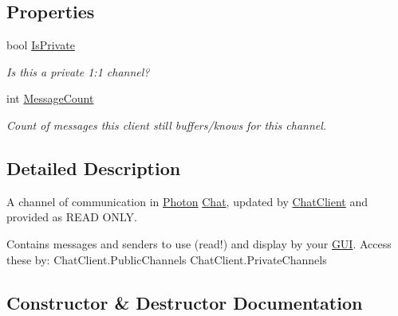 \subsection*{Properties}
\begin{DoxyCompactItemize}
\item 
bool \hyperlink{class_exit_games_1_1_client_1_1_photon_1_1_chat_1_1_chat_channel_a3486dbba0f3a83529fe4f327375548cb}{Is\+Private}
\begin{DoxyCompactList}\small\item\em Is this a private 1\+:1 channel?\end{DoxyCompactList}\item 
int \hyperlink{class_exit_games_1_1_client_1_1_photon_1_1_chat_1_1_chat_channel_a91a15ffc97cfd40eea6cf7965b99e5dc}{Message\+Count}
\begin{DoxyCompactList}\small\item\em Count of messages this client still buffers/knows for this channel.\end{DoxyCompactList}\end{DoxyCompactItemize}


\subsection{Detailed Description}
A channel of communication in \hyperlink{namespace_exit_games_1_1_client_1_1_photon}{Photon} \hyperlink{namespace_exit_games_1_1_client_1_1_photon_1_1_chat}{Chat}, updated by \hyperlink{class_exit_games_1_1_client_1_1_photon_1_1_chat_1_1_chat_client}{Chat\+Client} and provided as R\+E\+AD O\+N\+LY. 

Contains messages and senders to use (read!) and display by your \hyperlink{namespace_exit_games_1_1_client_1_1_g_u_i}{G\+UI}. Access these by\+: Chat\+Client.\+Public\+Channels Chat\+Client.\+Private\+Channels 

\subsection{Constructor \& Destructor Documentation}
